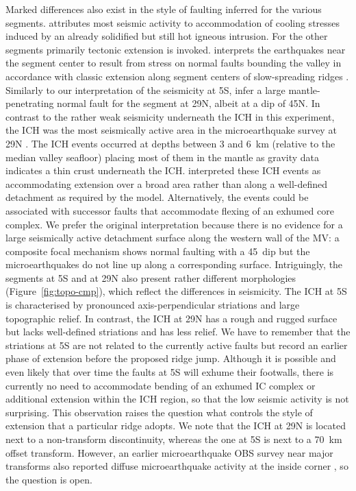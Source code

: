 \documentclass[aguplus]{aguplus}
\newlength{\tw}
\begin{document}
\begin{article}
Marked differences also
exist in  the style of faulting inferred for the various segments.
\citet{kong92} attributes most seismic activity to accommodation of
cooling stresses induced by an already solidified but still hot
igneous intrusion. For the other segments primarily tectonic extension
is invoked.  \citet{barclay01} interprets the earthquakes
 near the
segment center to result from  stress on normal faults bounding the
valley in accordance with classic extension along segment centers of
slow-spreading ridges \citep{mutter92}.   Similarly to our
interpretation of the seismicity at 5\dg S, \citet{toomey88} infer a
large mantle-penetrating
normal fault for the segment at 29\dg N, albeit
at a dip of 45\dg N.  In contrast to the rather weak seismicity
underneath the ICH in this experiment, the ICH was the most
seismically active area in the microearthquake survey at 29\dg N
\citep{wolfe95}.  The ICH events occurred at depths between 3
and 6~km (relative to the median valley seafloor) placing most of them
in the mantle as gravity data
indicates a thin crust underneath the ICH.  \citet{wolfe95} interpreted
these ICH events as accommodating extension over a broad area rather
than along a well-defined detachment as required by the
\citet{tucholke94} model. Alternatively, the events could be
associated with successor faults that accommodate flexing of an
exhumed core complex.  We prefer the original interpretation because
there is no evidence for a large seismically active detachment surface
along the western wall of the MV: a composite focal mechanism shows
normal faulting with a 45\dg\ dip but the microearthquakes do not
line up along  a corresponding surface.
Intriguingly, the segments at 5\dg S and at 29\dg N also
present rather different morphologies (Figure~\ref{fig:topo-cmp}),
which reflect the differences in seismicity.  The ICH at
5\dg S is characterised by pronounced axis-perpendicular striations
and large topographic relief.  In contrast, the ICH at 29\dg N has a
rough and rugged surface but lacks well-defined striations and has
less relief. We have to remember that the striations at 5\dg S are not
related to the currently active faults but record an earlier phase of
extension before the proposed ridge jump.  Although it is possible and even likely that
over time the faults at 5\dg S will exhume their footwalls, there is currently no need to accommodate  bending
of an exhumed IC complex or additional extension within the ICH
region, so that the low seismic activity is not surprising.
 This observation raises  the question what
controls the style of extension that a particular ridge adopts.   We
note that the
ICH at 29\dg N is located next to a non-transform discontinuity,
whereas the one at 5\dg S is next to a 70~km offset transform. However,
an earlier microearthquake OBS survey near major
transforms  also reported diffuse microearthquake activity at the inside
corner \citetext{Vema Transform, 11\dg N, \citealp{rowlett84};
Oceanographer's Transform, 35\dg N, \citealp{cessaro86}}, so the question is open.


\end{article}
\end{document}

